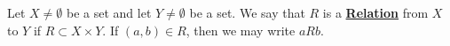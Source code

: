 \newcommand{\Relation}[0]{\textbf{\hyperref[def:Relation]{Relation}}\xspace}
\begin{df}[Relation]
\label{def:Relation}

\rm
    Let $X \neq \emptyset$ be a set
	and let $Y\neq \emptyset$ be a set. 
    We say that $R$ is a \Relation
    from $X$ to $Y$ if $R \subset X \times Y$. 
    If $(a,b) \in R$, then we may write
    $a R b$. 
\end{df}
